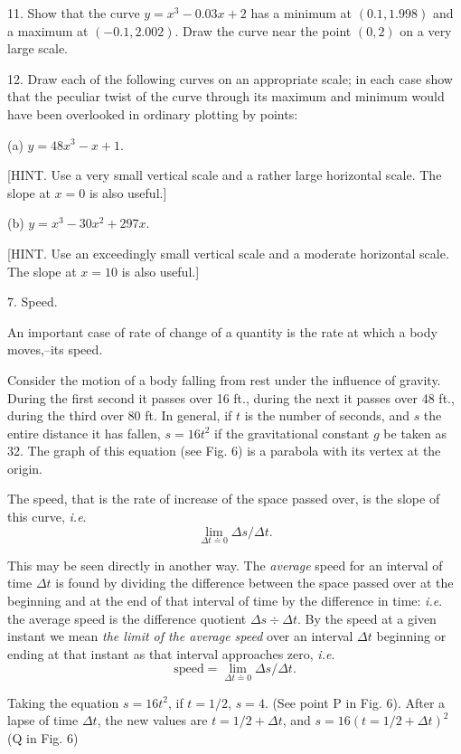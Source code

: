 \documentclass[12pt]{article}
\begin{document}
11. Show that the curve $y=x^{3}-0.03x+2$ has a minimum at 
$(0.1, 1.998)$ and a maximum at $(-0.1,2.002)$. Draw the curve near the point
$(0,2)$ on a very large scale.

12. Draw each of the following curves on an appropriate scale; in
each case show that the peculiar twist of the curve through its maximum
and minimum would have been overlooked in ordinary plotting by
points:
\begin{center}
(a) $y=48x^{3}-x+1$.
\end{center}
[HINT. Use a very small vertical scale and a rather large horizontal
scale. The slope at $x=0$ is also useful.]
\begin{center}
(b) $y=x^3-30x^{2}+297x$.
\end{center}
[HINT. Use an exceedingly small vertical scale and a moderate 
horizontal scale. The slope at $x=10$ is also useful.]

7. Speed.

An important case of rate of change of a quantity is the
rate at which a body moves,--its speed.

Consider the motion of a body falling from rest under the
influence of gravity. During the first second it passes over
16 ft., during the next it passes over 48 ft., during the third
over 80 ft. In general, if $t$ is the number of seconds, and $s$
the entire distance it has fallen, $s=16t^{2}$ if the gravitational
constant $g$ be taken as 32. The graph of this equation (see
Fig. 6) is a parabola with its vertex at the origin.

The speed, that is the rate of increase of the space passed
over, is the slope of this curve, {\it i.e}.
$$
\lim_{\Delta t \doteq 0}\Delta s/\Delta t.
$$

This may be seen directly in another way. The {\it average}
speed for an interval of time $\Delta t$ is found by dividing the 
difference between the space passed over at the beginning and at
the end of that interval of time by the difference in time: {\it i.e}.
the average speed is the difference quotient $\Delta s\div\Delta t$. By the
speed at a given instant we mean {\it the limit of the average speed}
over an interval $\Delta t$ beginning or ending at that instant as that
interval approaches zero, {\it i.e}.
$$
\mathrm{speed}=\lim_{\Delta t \doteq 0}\Delta s/\Delta t.
$$

Taking the equation $s = 16 t^2$, if $t = 1/2$, $s = 4$. 
(See point P in Fig. 6).  After a lapse of time $\Delta t$, the
new values are $t = 1/2 + \Delta t$, and $s = 16 (t = 1/2 + \Delta t)^2$
(Q in Fig. 6)
\end{document}

